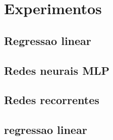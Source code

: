 
\chapter{Experimentos}


\section{Regressao linear}
\section{Redes neurais MLP}
\section{Redes recorrentes}
\section{regressao linear}